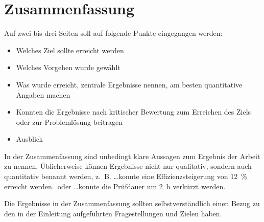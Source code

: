\chapter{Zusammenfassung}
\label{cha:zusammenfassung}

Auf zwei bis drei Seiten soll auf folgende Punkte eingegangen werden:

\begin{itemize}
	\item Welches Ziel sollte erreicht werden
	\item Welches Vorgehen wurde gewählt
	\item Was wurde erreicht, zentrale Ergebnisse nennen, am besten quantitative Angaben machen
	\item Konnten die Ergebnisse nach kritischer Bewertung zum Erreichen des Ziels oder zur Problemlösung beitragen
	\item  Ausblick
\end{itemize}

In der Zusammenfassung sind unbedingt klare Aussagen zum Ergebnis der Arbeit zu nennen. Üblicherweise können Ergebnisse nicht nur qualitativ, sondern auch quantitativ benannt werden, z.~B. \glqq \ldots konnte eine Effizienzsteigerung von \SI{12}{\percent} erreicht werden.\grqq~oder \glqq \ldots konnte die Prüfdauer um \SI{2}{\hour} verkürzt werden\grqq.

Die Ergebnisse in der Zusammenfassung sollten selbstverständlich einen Bezug zu den in der Einleitung aufgeführten Fragestellungen und Zielen haben.
